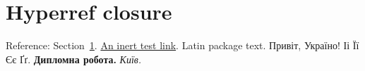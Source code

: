 \documentclass{article}
\begin{document}
\tableofcontents
\section{Hyperref closure}\label{sec:closure}
Reference: Section~\ref{sec:closure}. \href{https://example.invalid/}{An inert test link}.
\ifPDFTeX Latin package text.\else
Привіт, Україно! Іі Її Єє Ґґ. \textbf{Дипломна робота.} \textit{Київ.}
\fi
\end{document}
